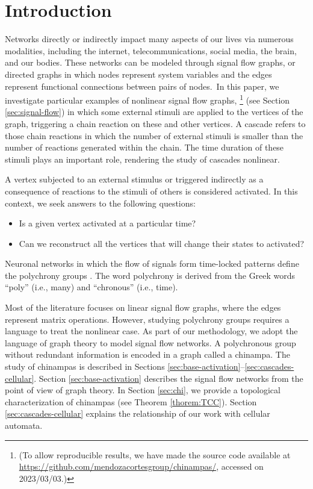 \documentclass[a4paper]{article}\usepackage[english]{babel}
\theoremstyle{definition}
\begin{document}
\section{Introduction}

Networks directly or indirectly impact many aspects of our lives via numerous modalities, including the internet, telecommunications, social media, the brain, and our bodies. These networks can be modeled through signal flow graphs, or directed graphs in which nodes represent system variables and the edges represent  functional connections between pairs of nodes.~In this paper, we investigate particular examples of nonlinear signal flow graphs, \footnote{({To allow reproducible results, we have made the source code} %
available at \url{https://github.com/mendozacortesgroup/chinampas/}, {accessed on 2023/03/03.})} %
(see Section \ref{sec:signal-flow}) in which some external stimuli are applied to the vertices of the graph, triggering a chain reaction on these and other vertices. A cascade refers to those chain reactions in which the number of external stimuli is smaller than the number of reactions generated within the chain. The time duration of these stimuli plays an important role, rendering the study of cascades nonlinear.

A vertex subjected to an external stimulus or triggered indirectly as a consequence of reactions to the stimuli of others is considered activated. In this context, we seek answers to the following questions: 

\begin{itemize}
\item Is a given vertex activated at a particular time?
\item Can we reconstruct all the vertices that will change their states to activated?
\end{itemize}

Neuronal networks in which the flow of signals form time-locked patterns define the polychrony groups \cite{izhikevich2006polychronization}. The word polychrony is derived from the Greek words ``poly'' (i.e., many) and ``chronous'' (i.e., time).  

Most of the literature focuses on linear signal flow graphs, where the edges represent matrix operations. However,  studying polychrony groups requires a language to treat the nonlinear case. As part of our methodology, we adopt the language of graph theory to model signal flow networks. A polychronous group without redundant information is encoded in a graph called a chinampa. The study of chinampas is described in Sections \ref{sec:base-activation}--\ref{sec:cascades-cellular}. \linebreak Section \ref{sec:base-activation} describes the signal flow networks from the point of view of graph theory. In Section \ref{sec:chi}, we provide a topological characterization of chinampas (see Theorem \ref{thorem:TCC}). Section \ref{sec:cascades-cellular} explains the relationship of our work with cellular automata.
\end{document}
